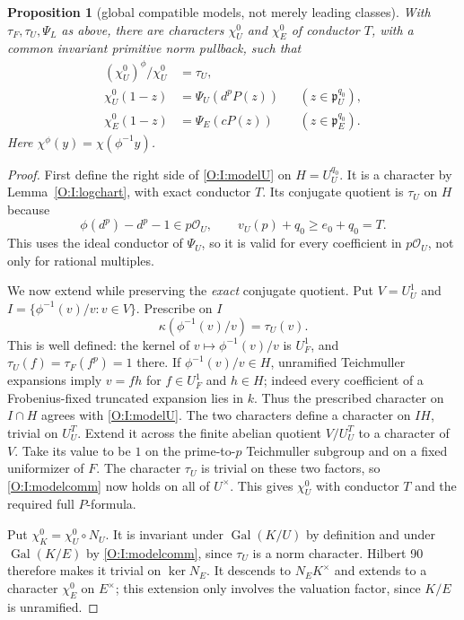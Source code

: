 \documentclass[11pt]{amsart}
\newtheorem{proposition}[theorem]{Proposition}
\theoremstyle{definition}
\theoremstyle{remark}
\newcommand{\Gal}{\operatorname{Gal}}
\newcommand{\OO}{\mathcal O}\newcommand{\pp}{\mathfrak p}\newcommand{\PP}{\mathfrak P}
\begin{document}
\begin{proposition}[global compatible models, not merely leading classes]
\label{O:I:canonical}
With $\tau_F,\tau_U,\Psi_L$ as above, there are characters $\chi_U^0$
and $\chi_E^0$ of conductor $T$, with a common invariant primitive norm pullback,
such that
\begin{align}
 (\chi_U^0)^\phi/\chi_U^0&=\tau_U,\label{O:I:modelcomm}\\
 \chi_U^0(1-z)&=\Psi_U(d^pP(z))
 &&(z\in\pp_U^{q_0}),\label{O:I:modelU}\\
 \chi_E^0(1-z)&=\Psi_E(cP(z))
 &&(z\in\pp_E^{q_0}).\label{O:I:modelE}
\end{align}
Here $\chi^\phi(y)=\chi(\phi^{-1}y)$.
\end{proposition}
\begin{proof}
First define the right side of \eqref{O:I:modelU} on $H=U_U^{q_0}$.
It is a character by Lemma~\ref{O:I:logchart}, with exact conductor $T$.
Its conjugate quotient is $\tau_U$ on $H$ because
\[
 \phi(d^p)-d^p-1\in p\OO_U,
 \qquad v_U(p)+q_0\ge e_0+q_0=T.
\]
This uses the ideal conductor of $\Psi_U$, so it is valid for every
coefficient in $p\OO_U$, not only for rational multiples.

We now extend while preserving the \emph{exact} conjugate quotient.
Put $V=U_U^1$ and $I=\{\phi^{-1}(v)/v:v\in V\}$. Prescribe on $I$
\[
 \kappa(\phi^{-1}(v)/v)=\tau_U(v).
\]
This is well defined: the kernel of $v\mapsto\phi^{-1}(v)/v$ is
$U_F^1$, and $\tau_U(f)=\tau_F(f^p)=1$ there.
If $\phi^{-1}(v)/v\in H$, unramified Teichmuller expansions imply
$v=f h$ for $f\in U_F^1$ and $h\in H$; indeed every coefficient of a
Frobenius-fixed truncated expansion lies in $k$. Thus the prescribed
character on $I\cap H$ agrees with \eqref{O:I:modelU}.
The two characters define a character on $IH$, trivial on $U_U^T$.
Extend it across the finite abelian quotient $V/U_U^T$ to a character of
$V$. Take its value to be $1$ on the prime-to-$p$ Teichmuller subgroup
and on a fixed uniformizer of $F$. The character $\tau_U$ is trivial on
these two factors, so \eqref{O:I:modelcomm} now holds on all of $U^\times$.
This gives $\chi_U^0$ with conductor $T$ and the required full $P$-formula.

Put $\chi_K^0=\chi_U^0\circ N_U$. It is invariant under $\Gal(K/U)$
by definition and under $\Gal(K/E)$ by \eqref{O:I:modelcomm}, since $\tau_U$
is a norm character. Hilbert 90 therefore makes it trivial on
$\ker N_E$. It descends to $N_EK^\times$ and extends to a character
$\chi_E^0$ on $E^\times$; this extension only involves the valuation
factor, since $K/E$ is unramified.


\end{proof}
\end{document}
